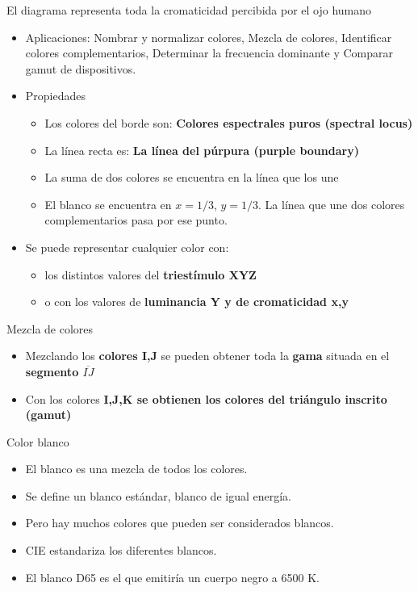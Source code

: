 El diagrama representa toda la cromaticidad percibida por el ojo humano
\begin{itemize}
    \item Aplicaciones: Nombrar y normalizar colores, Mezcla de colores, Identificar colores complementarios, Determinar la frecuencia dominante y Comparar gamut de dispositivos.
    \item Propiedades
    \begin{itemize}
        \item Los colores del borde son: \textbf{Colores espectrales puros (spectral locus)}
        \item La línea recta es: \textbf{La línea del púrpura (purple boundary)}
        \item La suma de dos colores se encuentra en la línea que los une
        \item El blanco se encuentra en $x=1/3$, $y=1/3$. La línea que une dos colores complementarios pasa por ese punto.
    \end{itemize}
    \item Se puede representar cualquier color con:
    \begin{itemize}
        \item los distintos valores del \textbf{triestímulo XYZ}
        \item o con los valores de \textbf{luminancia Y y de cromaticidad x,y}
    \end{itemize}
\end{itemize}

Mezcla de colores
\begin{itemize}
    \item Mezclando los \textbf{colores I,J} se pueden obtener toda la \textbf{gama} situada en el \textbf{segmento $\overline{IJ}$}
    \item Con los colores \textbf{I,J,K se obtienen los colores del triángulo inscrito (gamut)}
\end{itemize}

Color blanco
\begin{itemize}
    \item El blanco es una mezcla de todos los colores.
    \item Se define un blanco estándar, blanco de igual energía.
    \item Pero hay muchos colores que pueden ser considerados blancos.
    \item CIE estandariza los diferentes blancos.
    \item El blanco D65 es el que emitiría un cuerpo negro a 6500 K.
\end{itemize}
